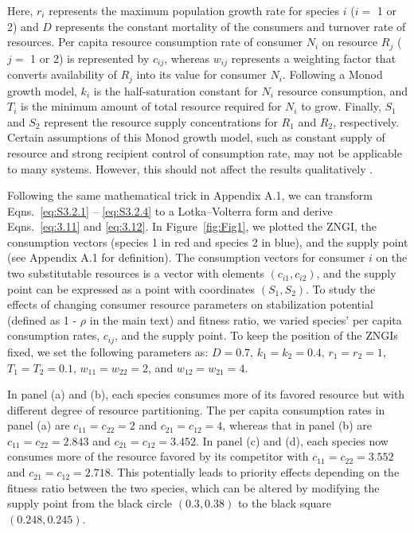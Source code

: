 \noindent Here, $r_{i}$ represents the maximum population growth rate for species $i$ ($i = $ 1 or 2) and $D$ represents the constant mortality of the consumers and turnover rate of resources. Per capita resource consumption rate of consumer $N_{i}$ on resource $R_{j}$ ($j = $ 1 or 2) is represented by $c_{ij}$, whereas $w_{ij}$ represents a weighting factor that converts availability of $R_{j}$ into its value for consumer $N_{i}$. Following a Monod growth model, $k_{i}$ is the half-saturation constant for $N_{i}$ resource consumption, and $T_{i}$ is the minimum amount of total resource required for $N_{i}$ to grow. Finally, $S_{1}$ and $S_{2}$ represent the resource supply concentrations for $R_{1}$ and $R_{2}$, respectively. Certain assumptions of this Monod growth model, such as constant supply of resource and strong recipient control of consumption rate, may not be applicable to many systems. However, this should not affect the results qualitatively \cite{Kleinhesselink2015}. 
\par


Following the same mathematical trick in Appendix A.1, we can transform Eqns.~\ref{eq:S3.2.1} -- \ref{eq:S3.2.4} to a Lotka--Volterra form and derive Eqns.~\ref{eq:3.11} and \ref{eq:3.12}. In Figure~\ref{fig:Fig1}, we plotted the ZNGI, the consumption vectors (species 1 in red and species 2 in blue), and the supply point (see Appendix A.1 for definition). The consumption vectors for consumer $i$ on the two substitutable resources is a vector with elements $\left( c_{i1}, c_{i2} \right)$, and the supply point can be expressed as a point with coordinates $\left( S_{1}, S_{2} \right)$. To study the effects of changing consumer resource parameters on stabilization potential (defined as 1 - $\rho$ in the main text) and fitness ratio, we varied species' per capita consumption rates, $c_{ij}$, and the supply point. To keep the position of the ZNGIs fixed, we set the following parameters as: $D = 0.7$, $k_{1} = k_{2} = 0.4$, $r_{1} = r_{2} = 1$, $T_{1} = T_{2} = 0.1$, $w_{11} = w_{22} = 2$, and $w_{12} = w_{21} = 4$. 
\par


In panel (a) and (b), each species consumes more of its favored resource but with different degree of resource partitioning. The per capita consumption rates in panel (a) are $c_{11} = c_{22} = 2$ and $c_{21} = c_{12} = 4$, whereas that in panel (b) are $c_{11} = c_{22} = 2.843$ and $c_{21} = c_{12} = 3.452$. In panel (c) and (d), each species now consumes more of the resource favored by its competitor with $c_{11} = c_{22} = 3.552$ and $c_{21} = c_{12} = 2.718$. This potentially leads to priority effects depending on the fitness ratio between the two species, which can be altered by modifying the supply point from the black circle $\left(0.3, 0.38\right)$ to the black square $\left(0.248, 0.245 \right)$. 
\par



